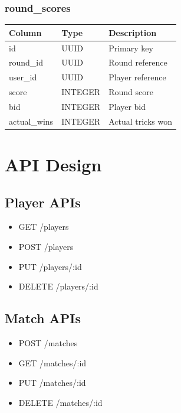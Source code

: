 \documentclass[11pt,a4paper]{article}
\begin{document}

\subsubsection{round\_scores}

\begin{longtable}{|p{4cm}|p{4cm}|p{5cm}|}
\hline
Column & Type & Description \\
\hline
id & UUID & Primary key \\
\hline
round\_id & UUID & Round reference \\
\hline
user\_id & UUID & Player reference \\
\hline
score & INTEGER & Round score \\
\hline
bid & INTEGER & Player bid \\
\hline
actual\_wins & INTEGER & Actual tricks won \\
\hline
\end{longtable}

\section{API Design}

\subsection{Player APIs}

\begin{itemize}
    \item GET /players
    \item POST /players
    \item PUT /players/:id
    \item DELETE /players/:id
\end{itemize}

\subsection{Match APIs}

\begin{itemize}
    \item POST /matches
    \item GET /matches/:id
    \item PUT /matches/:id
    \item DELETE /matches/:id
\end{itemize}
\end{document}
